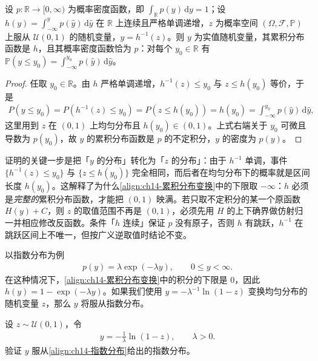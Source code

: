 \documentclass[../../main.tex]{subfiles}
\begin{document}
\begin{proposition}[逆变换采样的正确性]\label{proposition:ch14-逆变换正确性}
设 $p:\mathbb{R}\to[0,\infty)$ 为概率密度函数，即 $\int_{\mathbb{R}}p(y)\,\mathrm{d}y=1$；设 $h(y)=\int_{-\infty}^{y}p(\hat{y})\,\mathrm{d}\hat{y}$ 在 $\mathbb{R}$ 上连续且严格单调递增，$z$ 为概率空间 $(\Omega,\mathcal{F},\mathbb{P})$ 上服从 $\mathcal{U}(0,1)$ 的随机变量，$y=h^{-1}(z)$。则 $y$ 为实值随机变量，其累积分布函数是 $h$，且其概率密度函数恰为 $p$：对每个 $y_{0}\in\mathbb{R}$ 有 $\mathbb{P}(y\leqslant y_{0})=\int_{-\infty}^{y_{0}}p(\hat{y})\,\mathrm{d}\hat{y}$。
\end{proposition}

\begin{proof}
任取 $y_0\in\mathbb{R}$。由 $h$ 严格单调递增，$h^{-1}(z)\leqslant y_0$ 与 $z\leqslant h(y_0)$ 等价，于是
\begin{align*}
P(y\leqslant y_0)=P\left(h^{-1}(z)\leqslant y_0\right)=P\left(z\leqslant h(y_0)\right)=h(y_0)=\int_{-\infty}^{y_0}p(\hat{y})\,\mathrm{d}\hat{y},
\end{align*}
这里用到 $z$ 在 $(0,1)$ 上均匀分布且 $h(y_0)\in(0,1)$。上式右端关于 $y_0$ 可微且导数为 $p(y_0)$，故 $y$ 的累积分布函数是 $p$ 的不定积分，$y$ 的密度为 $p(y)$。
\end{proof}

\begin{remark}证明的关键一步是把「$y$ 的分布」转化为「$z$ 的分布」：由于 $h^{-1}$ 单调，事件 $\{h^{-1}(z)\leqslant y_0\}$ 与 $\{z\leqslant h(y_0)\}$ 完全相同，而后者在均匀分布下的概率就是区间长度 $h(y_0)$。这解释了为什么\eqref{align:ch14-累积分布变换}中的下限取 $-\infty$：$h$ 必须是\emph{完整的}累积分布函数，才能把 $(0,1)$ 映满。若只取不定积分的某一个原函数 $H(y)+C$，则 $z$ 的取值范围不再是 $(0,1)$，必须先用 $H$ 的上下确界做仿射归一并相应修改反函数。条件「$h$ 连续」保证 $p$ 没有原子，否则 $h$ 有跳跃，$h^{-1}$ 在跳跃区间上不唯一，但按广义逆取值时结论不变。
\end{remark}

以指数分布为例
\begin{align}
p(y)=\lambda\exp(-\lambda y),\qquad 0\leqslant y<\infty.
\label{align:ch14-指数分布}
\end{align}
在这种情况下，\eqref{align:ch14-累积分布变换}中的积分的下限是 $0$，因此 $h(y)=1-\exp(-\lambda y)$。如果我们使用 $y=-\lambda^{-1}\ln(1-z)$ 变换均匀分布的随机变量 $z$，那么 $y$ 将服从指数分布。

\begin{example}[ 指数分布的逆变换采样]\label{example:ch14-指数分布采样}
设 $z\sim\mathcal{U}(0,1)$，令
\begin{align*}
y=-\frac{1}{\lambda}\ln(1-z),\qquad \lambda>0.
\end{align*}
验证 $y$ 服从\eqref{align:ch14-指数分布}给出的指数分布。
\end{example}
\end{document}

